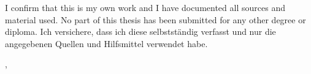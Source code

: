 \cleardoublepage{}

\thispagestyle{empty}
\vspace*{0.8\textheight}
\noindent
\makeatletter
{}
{I confirm that this \MakeLowercase{\getDoctype{}} is my own work and I have documented all sources and material used. No part of this thesis has been submitted for any other degree or diploma.}
{Ich versichere, dass ich diese \getDoctype{} selbstständig verfasst und nur die angegebenen Quellen und Hilfsmittel verwendet habe.}
\makeatother

\vfill
\noindent
\getSubmissionLocation{}, \getSubmissionDate{} \hspace{50mm} \getAuthor{}

\cleardoublepage{}
